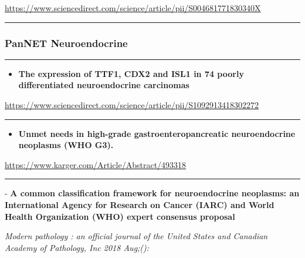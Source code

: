 \documentclass[]{article}
\providecommand{\tightlist}{%
  \setlength{\itemsep}{0pt}\setlength{\parskip}{0pt}}
\begin{document}
\url{https://www.sciencedirect.com/science/article/pii/S004681771830340X}

\begin{center}\rule{0.5\linewidth}{\linethickness}\end{center}

\hypertarget{pannet-neuroendocrine}{%
\subsubsection{PanNET Neuroendocrine}\label{pannet-neuroendocrine}}

\begin{center}\rule{0.5\linewidth}{\linethickness}\end{center}

\begin{itemize}
\tightlist
\item
  \textbf{The expression of TTF1, CDX2 and ISL1 in 74 poorly
  differentiated neuroendocrine carcinomas}
\end{itemize}

\url{https://www.sciencedirect.com/science/article/pii/S1092913418302272}

\begin{center}\rule{0.5\linewidth}{\linethickness}\end{center}

\begin{itemize}
\tightlist
\item
  \textbf{Unmet needs in high-grade gastroenteropancreatic
  neuroendocrine neoplasms (WHO G3).}
\end{itemize}

\url{https://www.karger.com/Article/Abstract/493318}

\begin{center}\rule{0.5\linewidth}{\linethickness}\end{center}

 - \textbf{A common classification framework for neuroendocrine
neoplasms: an International Agency for Research on Cancer (IARC) and
World Health Organization (WHO) expert consensus proposal}

\emph{Modern pathology : an official journal of the United States and
Canadian Academy of Pathology, Inc 2018 Aug;():}
\end{document}
